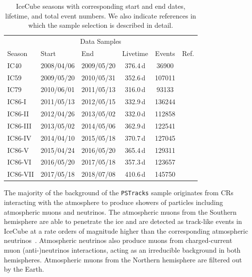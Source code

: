 \documentclass[aps,10pt,prd,twocolumn,floats,letterpaper,showpacs,nofootinbib,bibnotes,notitlepage,superscriptaddress,floatfix]{revtex4-1}
\begin{document}
\begin{table}[t]
\centering
\begin{ruledtabular}
\begin{tabular}{lllccc}
\multicolumn{6}{c}{Data Samples} \\[0.1cm]
Season & Start & End & Livetime & Events & Ref.\\ 
IC40 & 2008/04/06 & 2009/05/20 & 376.4\,d&  36900 & \cite{Abbasi:2010rd} \\
IC59 & 2009/05/20 & 2010/05/31 & 352.6\,d& 107011 &  \cite{Aartsen:2013uuv}\\
IC79 & 2010/06/01 & 2011/05/13 & 316.0\,d&  93133 & \cite{Schatto:2014kbj}\\
IC86-I & 2011/05/13 & 2012/05/15 & 332.9\,d & 136244 & \cite{Aartsen:2014cva} \\
IC86-II & 2012/04/26\footnotemark & 2013/05/02 & 332.0\,d & 112858 & \cite{Aartsen:2019fau} \\
IC86-III & 2013/05/02 & 2014/05/06 & 362.9\,d & 122541 &  \cite{Aartsen:2019fau}\\
IC86-IV & 2014/04/10\footnotemark & 2015/05/18 & 370.7\,d& 127045 & \cite{Aartsen:2019fau}\\
IC86-V & 2015/04/24\footnotemark & 2016/05/20 & 365.4\,d & 129311 & \cite{Aartsen:2019fau}\\
IC86-VI & 2016/05/20 & 2017/05/18 & 357.3\,d& 123657 & \cite{Aartsen:2019fau}\\
IC86-VII & 2017/05/18 & 2018/07/08 & 410.6\,d& 145750 & \cite{Aartsen:2019fau}\\
\end{tabular}
\end{ruledtabular}
\caption[]{IceCube seasons with corresponding start and end dates, lifetime, and total event numbers. We also indicate references in which the sample selection is described in detail.}\label{tab:livetimes}
\end{table}

The majority of the background of the {\tt PSTracks} sample originates from CRs interacting with the atmosphere to produce showers of particles including atmospheric muons and neutrinos. The atmospheric muons from the Southern hemisphere are able to penetrate the ice and are detected as track-like events in IceCube at a rate orders of magnitude higher than the corresponding atmospheric neutrinos~\cite{Aartsen:2016nxy}. Atmospheric neutrinos also produce muons from charged-current muon (anti-)neutrinos interactions, acting as an irreducible background in both hemispheres. Atmospheric muons from the Northern hemisphere are filtered out by the Earth. 
\end{document}
